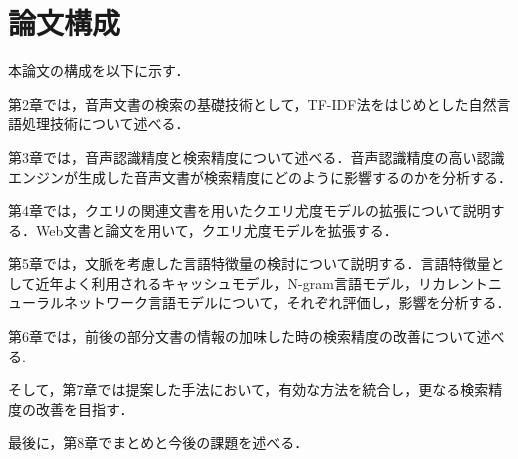 \section{論文構成}
\noindent
本論文の構成を以下に示す．

第2章では，音声文書の検索の基礎技術として，TF-IDF法をはじめとした自然言語処理技術について述べる．

第3章では，音声認識精度と検索精度について述べる．音声認識精度の高い認識エンジンが生成した音声文書が検索精度にどのように影響するのかを分析する．

第4章では，クエリの関連文書を用いたクエリ尤度モデルの拡張について説明する．Web文書と論文を用いて，クエリ尤度モデルを拡張する．

第5章では，文脈を考慮した言語特徴量の検討について説明する．言語特徴量として近年よく利用されるキャッシュモデル，N-gram言語モデル，リカレントニューラルネットワーク言語モデルについて，それぞれ評価し，影響を分析する．

第6章では，前後の部分文書の情報の加味した時の検索精度の改善について述べる. 

そして，第7章では提案した手法において，有効な方法を統合し，更なる検索精度の改善を目指す． 

最後に，第8章でまとめと今後の課題を述べる．


